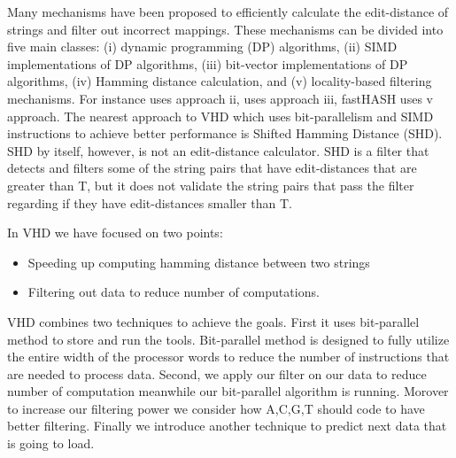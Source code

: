 Many mechanisms have been proposed to efficiently calculate the edit-distance of strings and filter out incorrect mappings. These mechanisms can be divided into five main classes: (i) dynamic programming (DP) algorithms, (ii) SIMD implementations of DP algorithms, (iii) bit-vector implementations of DP algorithms, (iv) Hamming distance calculation, and (v) locality-based filtering mechanisms. For instance \cite{swps3} uses approach ii, \cite{seqan} uses approach iii, fastHASH\cite{fasthash} uses v approach. The nearest approach to VHD which uses bit-parallelism and SIMD instructions to achieve better performance is Shifted Hamming Distance (SHD)\cite{shd}. SHD by itself, however, is not an edit-distance calculator. SHD is a filter that detects and filters some of the string pairs that have edit-distances that are greater than T, but it does not validate the string pairs that pass the filter regarding if they have edit-distances smaller than T.
  
In VHD we have focused on two points:
\begin{itemize}
\item Speeding up computing hamming distance between two strings
\item Filtering out data to reduce number of computations.
\end{itemize}
  
 VHD combines two techniques to achieve the goals. First it uses bit-parallel method to store and run the tools. Bit-parallel method is designed to fully utilize the entire width of the processor words to reduce the number of instructions that are needed to process data. Second, we apply  our filter on our data to reduce number of computation meanwhile our bit-parallel algorithm is running. Morover to increase our filtering power we consider how A,C,G,T should code to have better filtering. Finally we introduce another technique to predict next data that is going to load.
 
